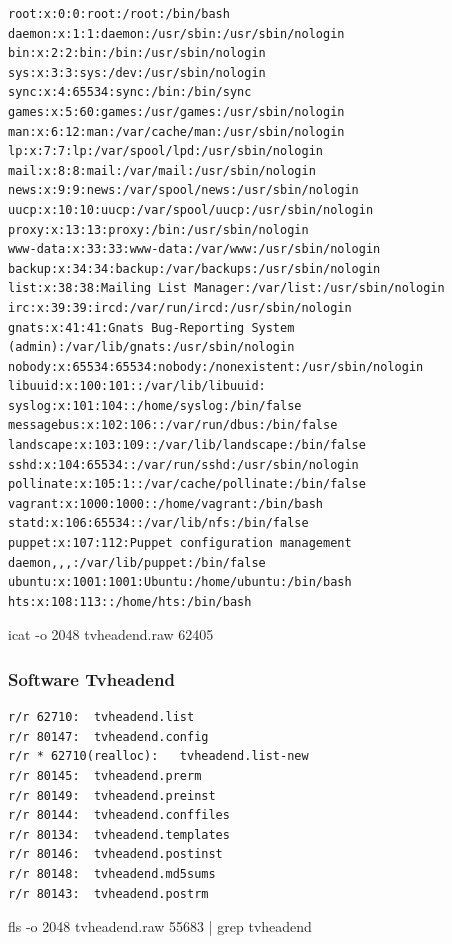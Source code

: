 \begin{cmd}[H]
\begin{verbatim}
root:x:0:0:root:/root:/bin/bash
daemon:x:1:1:daemon:/usr/sbin:/usr/sbin/nologin
bin:x:2:2:bin:/bin:/usr/sbin/nologin
sys:x:3:3:sys:/dev:/usr/sbin/nologin
sync:x:4:65534:sync:/bin:/bin/sync
games:x:5:60:games:/usr/games:/usr/sbin/nologin
man:x:6:12:man:/var/cache/man:/usr/sbin/nologin
lp:x:7:7:lp:/var/spool/lpd:/usr/sbin/nologin
mail:x:8:8:mail:/var/mail:/usr/sbin/nologin
news:x:9:9:news:/var/spool/news:/usr/sbin/nologin
uucp:x:10:10:uucp:/var/spool/uucp:/usr/sbin/nologin
proxy:x:13:13:proxy:/bin:/usr/sbin/nologin
www-data:x:33:33:www-data:/var/www:/usr/sbin/nologin
backup:x:34:34:backup:/var/backups:/usr/sbin/nologin
list:x:38:38:Mailing List Manager:/var/list:/usr/sbin/nologin
irc:x:39:39:ircd:/var/run/ircd:/usr/sbin/nologin
gnats:x:41:41:Gnats Bug-Reporting System (admin):/var/lib/gnats:/usr/sbin/nologin
nobody:x:65534:65534:nobody:/nonexistent:/usr/sbin/nologin
libuuid:x:100:101::/var/lib/libuuid:
syslog:x:101:104::/home/syslog:/bin/false
messagebus:x:102:106::/var/run/dbus:/bin/false
landscape:x:103:109::/var/lib/landscape:/bin/false
sshd:x:104:65534::/var/run/sshd:/usr/sbin/nologin
pollinate:x:105:1::/var/cache/pollinate:/bin/false
vagrant:x:1000:1000::/home/vagrant:/bin/bash
statd:x:106:65534::/var/lib/nfs:/bin/false
puppet:x:107:112:Puppet configuration management daemon,,,:/var/lib/puppet:/bin/false
ubuntu:x:1001:1001:Ubuntu:/home/ubuntu:/bin/bash
hts:x:108:113::/home/hts:/bin/bash
\end{verbatim}
\caption{icat -o 2048 tvheadend.raw 62405}
\label{cmd:tvheadend-passwd}
\end{cmd}

\subsubsection{Software Tvheadend}

\begin{cmd}[H]
\begin{verbatim}
r/r 62710:	tvheadend.list
r/r 80147:	tvheadend.config
r/r * 62710(realloc):	tvheadend.list-new
r/r 80145:	tvheadend.prerm
r/r 80149:	tvheadend.preinst
r/r 80144:	tvheadend.conffiles
r/r 80134:	tvheadend.templates
r/r 80146:	tvheadend.postinst
r/r 80148:	tvheadend.md5sums
r/r 80143:	tvheadend.postrm
\end{verbatim}
\caption{fls -o 2048 tvheadend.raw 55683 | grep tvheadend}
\label{cmd:tvheadend-dpkg}
\end{cmd}

